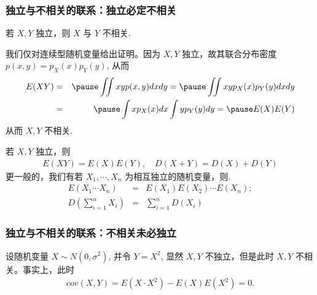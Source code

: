 \documentclass[Prob-All.tex]{subfiles}
\begin{document}
\begin{frame}
	\frametitle{独立与不相关的联系：独立必定不相关}
	\vspace{-0.2cm}
	\begin{thm}
		若 $X,Y$ 独立，则 $X$ 与 $Y$ 不相关.
	\end{thm}

	\zheng 我们仅对连续型随机变量给出证明。因为 $X,Y$ 独立，故其联合分布密度 $p (x,y)=p_X (x) p_Y (y)$, 从而
	\begin{eqnarray*}
		E(XY)&=&\pause \iint xyp(x,y)dxdy=\pause \iint xyp_X(x)p_Y(y)dxdy\\
		&=&\pause \int xp_X(x)dx\int yp_Y(y)dy =\pause E(X)E(Y)
	\end{eqnarray*}
	\pause 从而 $X,Y$ 不相关.
	\pause
	\begin{thm}
		若 $X,Y$ 独立，则
		\begin{eqnarray*}
			E(XY)=E(X)E(Y),\quad
			D(X+Y)=D(X)+D(Y)
		\end{eqnarray*}
		更一般的，我们有若 $X_1,\cdots,X_n$ 为相互独立的随机变量，则.
		\begin{eqnarray*}
			E(X_1\cdots X_n)&=&E(X_1)E(X_2)\cdots E(X_n);\\
			D(\sum_{i=1}^nX_i)&=&\sum_{i=1}^nD(X_i)
		\end{eqnarray*}
	\end{thm}

\end{frame}
\begin{frame}
	\frametitle{独立与不相关的联系：不相关未必独立}
	\begin{exam}
		设随机变量 $X\sim N (0,\sigma^2)$, 并令 $Y=X^2$, 显然 $X,Y$ 不独立，但是此时 $X,Y$ 不相关。事实上，此时
		\begin{eqnarray*}
			cov(X,Y)=E(X\cdot X^2)-E(X)E(X^2)=0.
		\end{eqnarray*}

	\end{exam}

\end{frame}
\end{document}
